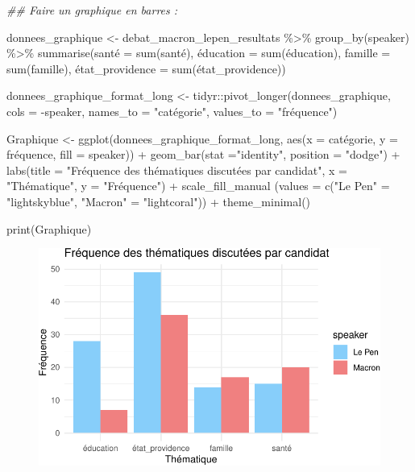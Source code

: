 \documentclass[
  letterpaper,
  DIV=11,
  numbers=noendperiod]{scrartcl}
\newenvironment{Shaded}{\begin{snugshade}}{\end{snugshade}}
\newcommand{\AttributeTok}[1]{\textcolor[rgb]{0.40,0.45,0.13}{#1}}
\newcommand{\DocumentationTok}[1]{\textcolor[rgb]{0.37,0.37,0.37}{\textit{#1}}}
\newcommand{\FunctionTok}[1]{\textcolor[rgb]{0.28,0.35,0.67}{#1}}
\newcommand{\NormalTok}[1]{\textcolor[rgb]{0.00,0.23,0.31}{#1}}
\newcommand{\OtherTok}[1]{\textcolor[rgb]{0.00,0.23,0.31}{#1}}
\newcommand{\SpecialCharTok}[1]{\textcolor[rgb]{0.37,0.37,0.37}{#1}}
\newcommand{\StringTok}[1]{\textcolor[rgb]{0.13,0.47,0.30}{#1}}
\begin{document}
\begin{Shaded}
\begin{Highlighting}[]
\DocumentationTok{\#\# Faire un graphique en barres : }

\NormalTok{donnees\_graphique }\OtherTok{\textless{}{-}}\NormalTok{ debat\_macron\_lepen\_resultats }\SpecialCharTok{\%\textgreater{}\%} \FunctionTok{group\_by}\NormalTok{(speaker) }\SpecialCharTok{\%\textgreater{}\%} \FunctionTok{summarise}\NormalTok{(santé }\OtherTok{=} \FunctionTok{sum}\NormalTok{(santé), é}\AttributeTok{ducation =} \FunctionTok{sum}\NormalTok{(éducation), }\AttributeTok{famille =} \FunctionTok{sum}\NormalTok{(famille), é}\AttributeTok{tat\_providence =} \FunctionTok{sum}\NormalTok{(état\_providence))}

\NormalTok{donnees\_graphique\_format\_long }\OtherTok{\textless{}{-}}\NormalTok{ tidyr}\SpecialCharTok{::}\FunctionTok{pivot\_longer}\NormalTok{(donnees\_graphique, }\AttributeTok{cols =} \SpecialCharTok{{-}}\NormalTok{speaker, }\AttributeTok{names\_to =} \StringTok{"catégorie"}\NormalTok{, }\AttributeTok{values\_to =} \StringTok{"fréquence"}\NormalTok{)}


\NormalTok{Graphique }\OtherTok{\textless{}{-}} \FunctionTok{ggplot}\NormalTok{(donnees\_graphique\_format\_long, }\FunctionTok{aes}\NormalTok{(}\AttributeTok{x =}\NormalTok{ catégorie, }\AttributeTok{y =}\NormalTok{ fréquence, }\AttributeTok{fill =}\NormalTok{ speaker)) }\SpecialCharTok{+} \FunctionTok{geom\_bar}\NormalTok{(}\AttributeTok{stat =}\StringTok{"identity"}\NormalTok{, }\AttributeTok{position =} \StringTok{"dodge"}\NormalTok{) }\SpecialCharTok{+} \FunctionTok{labs}\NormalTok{(}\AttributeTok{title =} \StringTok{"Fréquence des thématiques discutées par candidat"}\NormalTok{, }\AttributeTok{x =} \StringTok{"Thématique"}\NormalTok{, }\AttributeTok{y =} \StringTok{"Fréquence"}\NormalTok{) }\SpecialCharTok{+} \FunctionTok{scale\_fill\_manual}\NormalTok{ (}\AttributeTok{values =} \FunctionTok{c}\NormalTok{(}\StringTok{"Le Pen"} \OtherTok{=} \StringTok{"lightskyblue"}\NormalTok{, }\StringTok{"Macron"} \OtherTok{=} \StringTok{"lightcoral"}\NormalTok{)) }\SpecialCharTok{+} \FunctionTok{theme\_minimal}\NormalTok{()}


\FunctionTok{print}\NormalTok{(Graphique)}
\end{Highlighting}
\end{Shaded}

\begin{figure}[H]

{\centering \includegraphics{tp3-fas1001-Saffioti_files/figure-pdf/unnamed-chunk-2-1.pdf}

}

\end{figure}
\end{document}
